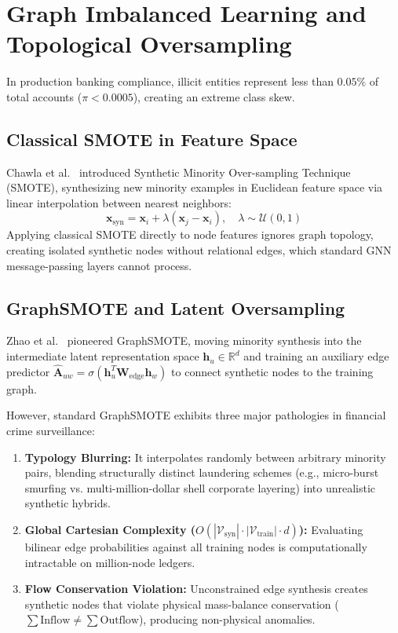 \section{Graph Imbalanced Learning and Topological Oversampling}
In production banking compliance, illicit entities represent less than $0.05\%$ of total accounts ($\pi < 0.0005$), creating an extreme class skew.

\subsection{Classical SMOTE in Feature Space}
Chawla et al.~\cite{chawla2002smote} introduced Synthetic Minority Over-sampling Technique (SMOTE), synthesizing new minority examples in Euclidean feature space via linear interpolation between nearest neighbors:
\begin{equation}
\mathbf{x}_{\text{syn}} = \mathbf{x}_i + \lambda (\mathbf{x}_j - \mathbf{x}_i), \quad \lambda \sim \mathcal{U}(0, 1)
\end{equation}
Applying classical SMOTE directly to node features ignores graph topology, creating isolated synthetic nodes without relational edges, which standard GNN message-passing layers cannot process.

\subsection{GraphSMOTE and Latent Oversampling}
Zhao et al.~\cite{zhao2021graphsmote} pioneered GraphSMOTE, moving minority synthesis into the intermediate latent representation space $\mathbf{h}_u \in \mathbb{R}^d$ and training an auxiliary edge predictor $\hat{\mathbf{A}}_{uw} = \sigma(\mathbf{h}_u^T \mathbf{W}_{\text{edge}} \mathbf{h}_w)$ to connect synthetic nodes to the training graph.

However, standard GraphSMOTE exhibits three major pathologies in financial crime surveillance:
\begin{enumerate}
    \item \textbf{Typology Blurring:} It interpolates randomly between arbitrary minority pairs, blending structurally distinct laundering schemes (e.g., micro-burst smurfing vs. multi-million-dollar shell corporate layering) into unrealistic synthetic hybrids.
    \item \textbf{Global Cartesian Complexity ($O(|\mathcal{V}_{\text{syn}}| \cdot |\mathcal{V}_{\text{train}}| \cdot d)$):} Evaluating bilinear edge probabilities against all training nodes is computationally intractable on million-node ledgers.
    \item \textbf{Flow Conservation Violation:} Unconstrained edge synthesis creates synthetic nodes that violate physical mass-balance conservation ($\sum \text{Inflow} \neq \sum \text{Outflow}$), producing non-physical anomalies.
\end{enumerate}

